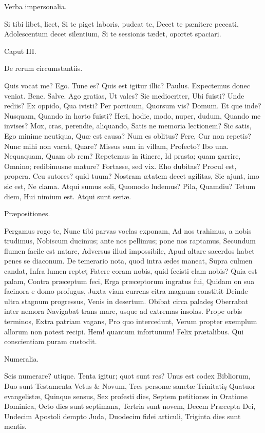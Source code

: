 Verba impersonalia.

Si tibi libet, licet,
Si te piget laboris, pudeat te,
Decet te pænitere peccati,
Adolescentum decet silentium,
Si te sessionis tædet, oportet spaciari.

Caput III.

De rerum circumstantiis.

Quis vocat me? Ego.
Tune es? Quis est igitur illic? Paulus.
Expectemus donec veniat. Bene.
Salve. Ago gratias,
Ut vales? Sic mediocriter,
Ubi fuisti? Unde rediis? Ex oppido,
Qua ivisti? Per porticum,
Quorsum vis? Domum.
Et que inde? Nusquam,
Quando in horto fuisti?
Heri, hodie, modo, nuper, dudum,
Quando me invises?
Mox, cras, perendie, aliquando,
Satis ne memoria lectionem? Sic satis,
Ego minime neutiqua,
Quæ est causa? Num es oblitus? Fere,
Cur non repetis?
Nunc mihi non vacat,
Quare? Missus sum in villam,
Profecto? Ibo una. Nequaquam,
Quam ob rem? Repetemus in itinere,
Id prasta; quam garrire,
Omnino; redibimusne mature?
Fortasse, sed vix. Eho dubitas?
Procul est, propera.
Ceu sutores? quid tuum?
Nostram ætatem decet agilitas,
Sic ajunt, imo sic est,
Ne clama. Atqui sumus soli,
Quomodo ludemus? Pila,
Quamdiu? Tetum diem,
Hui nimium est. Atqui sunt seriæ.

Præpositiones.

Pergamus rogo te,
Nunc tibi parvas voclas exponam,
Ad nos trahimus, a nobis trudimus,
Nobiscum ducimus; ante nos pellimus; pone nos raptamus,
Secundum flumen facile est natare,
Adversus illud impossibile,
Apud altare sacerdos habet penes se diaconum.
De temerario nota, quod intra ædes maneat,
Supra culmen candat,
Infra lumen repteţ
Fatere coram nobis, quid fecisti clam nobis?
Quia est palam,
Contra præceptum feci,
Erga præceptorum ingratus fui,
Quidam on sua facinora e domo profugus,
Juxta viam currens citra magnum constitit
Deinde ultra stagnum progressus,
Venis in desertum.
Obibat circa paladeş
Oberrabat inter nemora
Navigabat trans mare, usque ad extremas insolas.
Prope orbis terminos,
Extra patriam vagans,
Pro quo intercedunt,
Verum propter exemplum allorum non potest recipi.
Hem! quantum infortunum!
Felix prætalibus.
Qui conscientiam puram custodit.

Numeralia.

Scis numerare? utique.
Tenta igitur; quot sunt res?
Unus est codex Bibliorum,
Duo sunt Testamenta Vetus & Novum,
Tres personæ sanctæ Trinitatiş
Quatuor evangelistæ,
Quinque sensus,
Sex profesti dies,
Septem petitiones in Oratione Dominica,
Octo dies sunt septimana,
Tertria sunt novem,
Decem Præcepta Dei,
Undecim Apostoli dempto Juda,
Duodecim fidei articuli,
Triginta dies sunt mentis.

